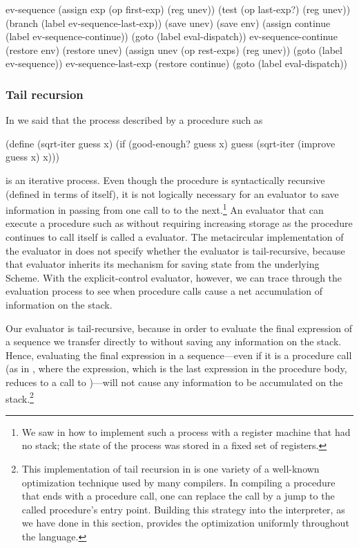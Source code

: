 \begin{codeBlock}
ev-sequence
  (assign exp (op first-exp) (reg unev))
  (test (op last-exp?) (reg unev))
  (branch (label ev-sequence-last-exp))
  (save unev)
  (save env)
  (assign continue (label ev-sequence-continue))
  (goto (label eval-dispatch))
ev-sequence-continue
  (restore env)
  (restore unev)
  (assign unev (op rest-exps) (reg unev))
  (goto (label ev-sequence))
ev-sequence-last-exp
  (restore continue)
  (goto (label eval-dispatch))
\end{codeBlock}

\subsubsection*{Tail recursion}

In  we said that the process described by a procedure such as

\begin{codeBlock}
(define (sqrt-iter guess x)
  (if (good-enough? guess x)
      guess
      (sqrt-iter (improve guess x) x)))
\end{codeBlock}

\noindent
is an iterative process.  Even though the procedure is syntactically recursive
(defined in terms of itself), it is not logically necessary for an evaluator to
save information in passing from one call to  to the
next.\footnote{We saw in  how to implement such a process with
a register machine that had no stack; the state of the process was stored in a
fixed set of registers.} An evaluator that can execute a procedure such as
 without requiring increasing storage as the procedure
continues to call itself is called a  evaluator.  The
metacircular implementation of the evaluator in  does not
specify whether the evaluator is tail-recursive, because that evaluator
inherits its mechanism for saving state from the underlying Scheme.  With the
explicit-control evaluator, however, we can trace through the evaluation
process to see when procedure calls cause a net accumulation of information on
the stack.

Our evaluator is tail-recursive, because in order to evaluate the final
expression of a sequence we transfer directly to  without
saving any information on the stack.  Hence, evaluating the final expression in
a sequence---even if it is a procedure call (as in , where the
 expression, which is the last expression in the procedure body,
reduces to a call to )---will not cause any information to be
accumulated on the stack.\footnote{This implementation of tail recursion in
 is one variety of a well-known optimization technique used
by many compilers.  In compiling a procedure that ends with a procedure call,
one can replace the call by a jump to the called procedure's entry point.
Building this strategy into the interpreter, as we have done in this section,
provides the optimization uniformly throughout the language.}

